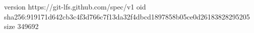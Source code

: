 version https://git-lfs.github.com/spec/v1
oid sha256:919171d642cb3c4f3d766c7f13da32f4dbcd1897858b05ce0d26183828295205
size 349692
